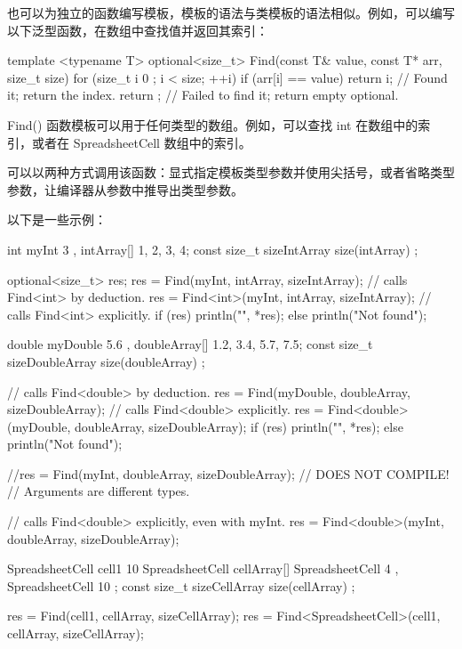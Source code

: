 
也可以为独立的函数编写模板，模板的语法与类模板的语法相似。例如，可以编写以下泛型函数，在数组中查找值并返回其索引：

\begin{cpp}
template <typename T>
optional<size_t> Find(const T& value, const T* arr, size_t size)
{
    for (size_t i { 0 }; i < size; ++i) {
        if (arr[i] == value) {
            return i; // Found it; return the index.
        }
    }
    return {}; // Failed to find it; return empty optional.
}
\end{cpp}

Find() 函数模板可以用于任何类型的数组。例如，可以查找 int 在数组中的索引，或者在 SpreadsheetCell 数组中的索引。

可以以两种方式调用该函数：显式指定模板类型参数并使用尖括号，或者省略类型参数，让编译器从参数中推导出类型参数。

以下是一些示例：

\begin{cpp}
int myInt { 3 }, intArray[] {1, 2, 3, 4};
const size_t sizeIntArray { size(intArray) };

optional<size_t> res;
res = Find(myInt, intArray, sizeIntArray); // calls Find<int> by deduction.
res = Find<int>(myInt, intArray, sizeIntArray); // calls Find<int> explicitly.
if (res) { println("{}", *res); }
else { println("Not found"); }

double myDouble { 5.6 }, doubleArray[] {1.2, 3.4, 5.7, 7.5};
const size_t sizeDoubleArray { size(doubleArray) };

// calls Find<double> by deduction.
res = Find(myDouble, doubleArray, sizeDoubleArray);
// calls Find<double> explicitly.
res = Find<double>(myDouble, doubleArray, sizeDoubleArray);
if (res) { println("{}", *res); }
else { println("Not found"); }

//res = Find(myInt, doubleArray, sizeDoubleArray); // DOES NOT COMPILE!
                                                // Arguments are different types.

// calls Find<double> explicitly, even with myInt.
res = Find<double>(myInt, doubleArray, sizeDoubleArray);

SpreadsheetCell cell1 { 10 }
SpreadsheetCell cellArray[] { SpreadsheetCell { 4 }, SpreadsheetCell { 10 } };
const size_t sizeCellArray { size(cellArray) };

res = Find(cell1, cellArray, sizeCellArray);
res = Find<SpreadsheetCell>(cell1, cellArray, sizeCellArray);
\end{cpp}

